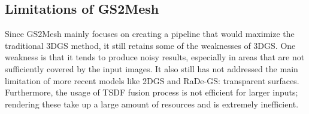 \subsection{Limitations of GS2Mesh}

Since GS2Mesh mainly focuses on creating a pipeline that would maximize the traditional 3DGS method, it still retains some of the weaknesses of 3DGS. One weakness is that it tends to produce noisy results, especially in areas that are not sufficiently covered by the input images. It also still has not addressed the main limitation of more recent models like 2DGS and RaDe-GS: transparent surfaces. Furthermore, the usage of TSDF fusion process is not efficient for larger inputs; rendering these take up a large amount of resources and is extremely inefficient.


